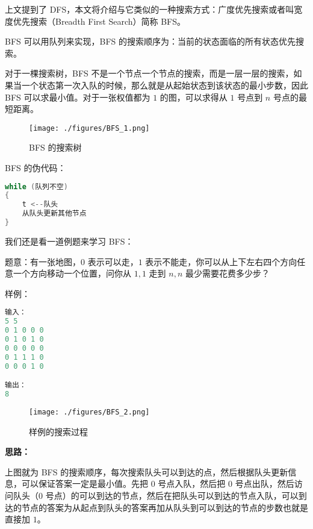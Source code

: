 

上文提到了 DFS，本文将介绍与它类似的一种搜索方式：广度优先搜索或者叫宽度优先搜索（Breadth First Search）简称 BFS。

BFS 可以用队列来实现，BFS 的搜索顺序为：当前的状态面临的所有状态优先搜索。

对于一棵搜索树，BFS 不是一个节点一个节点的搜索，而是一层一层的搜索，如果当一个状态第一次入队的时候，那么就是从起始状态到该状态的最小步数，因此 BFS 可以求最小值。对于一张权值都为 $1$ 的图，可以求得从 $1$ 号点到 $n$ 号点的最短距离。

\begin{figure}[ht]
\centering
\texttt{[image: ./figures/BFS\_1.png]}
\caption{BFS 的搜索树} \label{BFS_fig1}
\end{figure}


BFS 的伪代码：\begin{lstlisting}[language=cpp]
while (队列不空) 
{
    t <--队头
    从队头更新其他节点
}
\end{lstlisting}

我们还是看一道例题来学习 BFS：

题意：有一张地图，$0$ 表示可以走，$1$ 表示不能走，你可以从上下左右四个方向任意一个方向移动一个位置，问你从 $1,1$ 走到 $n,n$ 最少需要花费多少步？

样例：\begin{lstlisting}[language=cpp]
输入：
5 5
0 1 0 0 0
0 1 0 1 0
0 0 0 0 0
0 1 1 1 0
0 0 0 1 0

输出：
8
\end{lstlisting}
\begin{figure}[ht]
\centering
\texttt{[image: ./figures/BFS\_2.png]}
\caption{样例的搜索过程} \label{BFS_fig2}
\end{figure}

\textbf{思路：}

上图就为 BFS 的搜索顺序，每次搜索队头可以到达的点，然后根据队头更新信息，可以保证答案一定是最小值。先把 $0$ 号点入队，然后把 $0$ 号点出队，然后访问队头（$0$ 号点）的可以到达的节点，然后在把队头可以到达的节点入队，可以到达的节点的答案为从起点到队头的答案再加从队头到可以到达的节点的步数也就是直接加 $1$。

